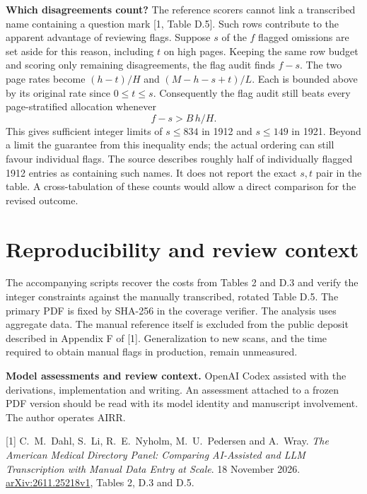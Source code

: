 \documentclass[11pt]{article}
\begin{document}
\textbf{Which disagreements count?} The reference scorers cannot link a transcribed name containing a question mark [1, Table D.5]. Such rows contribute to the apparent advantage of reviewing flags. Suppose $s$ of the $f$ flagged omissions are set aside for this reason, including $t$ on high pages. Keeping the same row budget and scoring only remaining disagreements, the flag audit finds $f-s$. The two page rates become $(h-t)/H$ and $(M-h-s+t)/L$. Each is bounded above by its original rate since $0\le t\le s$. Consequently the flag audit still beats every page-stratified allocation whenever
\[
 f-s>B\,h/H.
\]
This gives sufficient integer limits of $s\le834$ in 1912 and $s\le149$ in 1921. Beyond a limit the guarantee from this inequality ends; the actual ordering can still favour individual flags. The source describes roughly half of individually flagged 1912 entries as containing such names. It does not report the exact $s,t$ pair in the table. A cross-tabulation of these counts would allow a direct comparison for the revised outcome.

\section*{Reproducibility and review context}
The accompanying scripts recover the costs from Tables 2 and D.3 and verify the integer constraints against the manually transcribed, rotated Table D.5. The primary PDF is fixed by SHA-256 in the coverage verifier. The analysis uses aggregate data. The manual reference itself is excluded from the public deposit described in Appendix F of [1]. Generalization to new scans, and the time required to obtain manual flags in production, remain unmeasured.

\textbf{Model assessments and review context.} OpenAI Codex assisted with the derivations, implementation and writing. An assessment attached to a frozen PDF version should be read with its model identity and manuscript involvement. The author operates AIRR.

\small [1] C.\ M.\ Dahl, S.\ Li, R.\ E.\ Nyholm, M.\ U.\ Pedersen and A.\ Wray.
\emph{The American Medical Directory Panel: Comparing AI-Assisted and LLM Transcription with Manual Data Entry at Scale}. 18 November 2026. \href{https://arxiv.org/abs/2611.25218v1}{arXiv:2611.25218v1}, Tables 2, D.3 and D.5.
\end{document}
